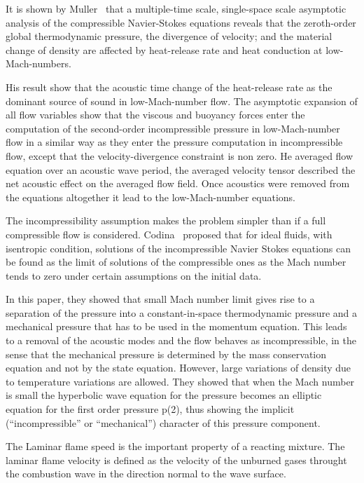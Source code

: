 It is shown by Muller~\cite{Muller} that a multiple-time scale,
single-space scale asymptotic analysis of the compressible
Navier-Stokes equations reveals that the zeroth-order global
thermodynamic pressure, the divergence of velocity; and the material
change of density are affected by heat-release rate and heat
conduction at low-Mach-numbers.

\bigskip
\noindent His result show that the acoustic time change of the
heat-release rate as the dominant source of sound in low-Mach-number
flow. The asymptotic expansion of all flow variables show that the
viscous and buoyancy forces enter the computation of the second-order
incompressible pressure in low-Mach-number flow in a similar way as
they enter the pressure computation in incompressible flow, except
that the velocity-divergence constraint is non zero. He averaged flow
equation over an acoustic wave period, the averaged velocity tensor
described the net acoustic effect on the averaged flow field. Once
acoustics were removed from the equations altogether it lead to the
low-Mach-number equations.

\bigskip
\noindent The incompressibility assumption makes the problem simpler
than if a full compressible flow is considered. Codina~\cite{Codina}
proposed that for ideal fluids, with isentropic condition, solutions
of the incompressible Navier Stokes equations can be found as the
limit of solutions of the compressible ones as the Mach number tends
to zero under certain assumptions on the initial data.

\noindent In this paper, they showed that small Mach number limit
gives rise to a separation of the pressure into a constant-in-space
thermodynamic pressure and a mechanical pressure that has to be used
in the momentum equation. This leads to a removal of the acoustic
modes and the flow behaves as incompressible, in the sense that the
mechanical pressure is determined by the mass conservation equation
and not by the state equation. However, large variations of density
due to temperature variations are allowed. They showed that when the
Mach number is small the hyperbolic wave equation for the pressure
becomes an elliptic equation for the first order pressure p(2), thus
showing the implicit (“incompressible” or “mechanical”) character of
this pressure component.


\noindent The Laminar flame speed is the important property of a
reacting mixture. The laminar flame velocity is defined as the
velocity of the unburned gases throught the combustion wave in the
direction normal to the wave surface.

